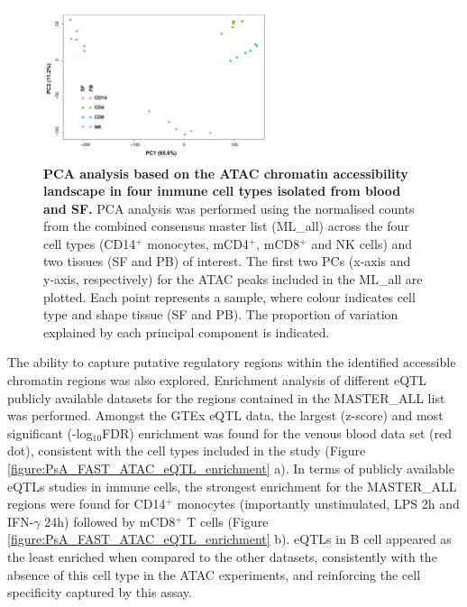 \begin{figure}[H]
\centering
\includegraphics[width=0.6\textwidth]{./Results3/pdfs/ATAC_PSA_all_DESEq2_PCA}
\caption[PCA analysis based on the ATAC chromatin accessibility landscape in four immune cell types isolated from blood and SF.]{\textbf{PCA analysis based on the ATAC chromatin accessibility landscape in four immune cell types isolated from blood and SF.} PCA analysis was performed using the normalised counts from the combined consensus master list (ML\_all) across the four cell types (CD14$^+$ monocytes, mCD4$^+$, mCD8$^+$ and NK cells) and two tissues (SF and PB) of interest. The first two PCs (x-axis and y-axis, respectively) for the ATAC peaks included in the ML\_all are plotted. Each point represents a sample, where colour indicates cell type and shape tissue (SF and PB). The proportion of variation explained by each principal component is indicated.}
\label{figure:Core_ATAC_all_conditions_PCA}
\label{figure:PsA_FAST_ATAC_PCA}
\end{figure}



The ability to capture putative regulatory regions within the identified accessible chromatin regions was also explored. Enrichment analysis of different eQTL publicly available datasets for the regions contained in the MASTER\_ALL list was performed. Amongst the GTEx eQTL data, the largest (z-score) and most significant (-log$_10$FDR) enrichment was found for the venous blood data set (red dot), consistent with the cell types included in the study (Figure \ref{figure:PsA_FAST_ATAC_eQTL_enrichment} a). In terms of publicly available eQTLs studies in immune cells, the strongest enrichment for the MASTER\_ALL regions were found for CD14$^+$ monocytes (importantly unstimulated, LPS 2h and IFN-$\gamma$ 24h) followed by mCD8$^+$ T cells (Figure \ref{figure:PsA_FAST_ATAC_eQTL_enrichment} b). eQTLs in B cell appeared as the least enriched when compared to the other datasets, consistently with the absence of this cell type in the ATAC experiments, and reinforcing the cell specificity captured by this assay.


